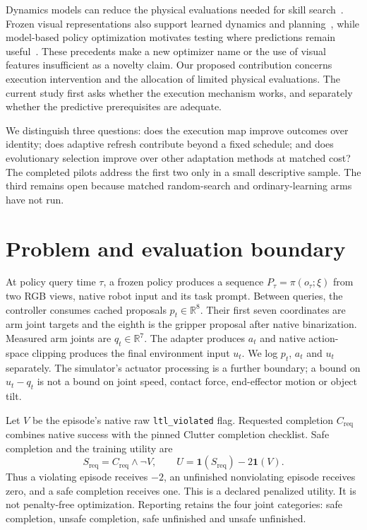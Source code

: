 \documentclass[sigconf,dvipsnames]{acmart}
\newcommand{\ind}{\mathbf{1}}
\newcommand{\safe}{S_{\mathrm{req}}}
\newcommand{\complete}{C_{\mathrm{req}}}
\begin{document}
Dynamics models can reduce the physical evaluations needed for skill
search~\cite{daqd}. Frozen visual representations also support learned dynamics
and planning~\cite{dinov2,dinowm}, while model-based policy optimization motivates
testing where predictions remain useful~\cite{mbpo}. These precedents make a new
optimizer name or the use of visual features insufficient as a novelty claim.
Our proposed contribution concerns execution intervention and the allocation of
limited physical evaluations. The current study first asks whether the execution
mechanism works, and separately whether the predictive prerequisites are adequate.

We distinguish three questions: does the execution map improve outcomes over identity;
does adaptive refresh contribute beyond a fixed schedule; and does evolutionary
selection improve over other adaptation methods at matched cost? The completed
pilots address the first two only in a small descriptive sample. The third remains
open because matched random-search and ordinary-learning arms have not run.

\section{Problem and evaluation boundary}
At policy query time $\tau$, a frozen policy produces a sequence
$P_\tau=\pi(o_\tau;\xi)$ from two RGB views, native robot input and its task prompt.
Between queries, the controller consumes cached proposals $p_t\in\mathbb R^8$.
Their first seven coordinates are arm joint targets and the eighth is the gripper
proposal after native binarization. Measured arm joints are $q_t\in\mathbb R^7$.
The adapter produces $a_t$ and native action-space clipping produces the final
environment input $u_t$. We log $p_t$, $a_t$ and $u_t$ separately. The simulator's
actuator processing is a further boundary; a bound on $u_t-q_t$ is not a bound on
joint speed, contact force, end-effector motion or object tilt.

Let $V$ be the episode's native raw \texttt{ltl\_violated} flag. Requested completion
$\complete$ combines native success with the pinned Clutter completion checklist.
Safe completion and the training utility are
\begin{equation}
 \safe=\complete\land\neg V,\qquad
 U=\ind(\safe)-2\ind(V).
 \label{eq:utility}
\end{equation}
Thus a violating episode receives $-2$, an unfinished nonviolating episode receives
zero, and a safe completion receives one. This is a declared penalized utility.
It is not penalty-free optimization. Reporting retains the four joint categories:
safe completion, unsafe completion, safe unfinished and unsafe unfinished.
\end{document}
